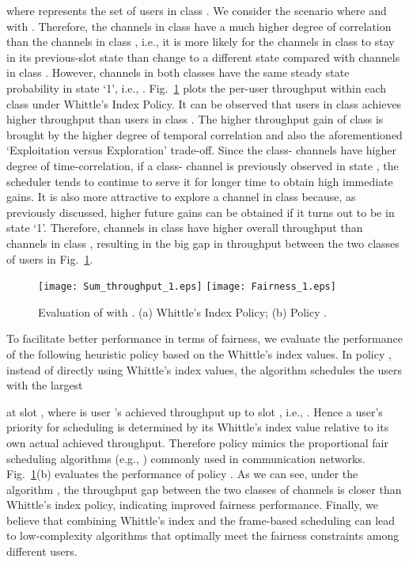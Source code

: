 \documentclass[11pt,twocolumn]{IEEEtran}
\begin{document}
where  represents the set of users in class . We consider the scenario where  and  with . Therefore, the channels in class  have a much higher degree of correlation than the channels in class , i.e., it is more likely for the channels in class  to stay in its previous-slot state than change to a different state compared with channels in class . However, channels in both classes have the same steady state probability in state `1', i.e., . Fig.~\ref{fig:Fairness} plots the per-user throughput within each class under Whittle's Index Policy. It can be observed that users in class  achieves higher throughput than users in class . The higher throughput gain of class  is brought by the higher degree of temporal correlation and also the aforementioned `Exploitation versus Exploration' trade-off. Since the class- channels have higher degree of time-correlation, if a class- channel is previously observed in state , the scheduler tends to continue to serve it for longer time to obtain high immediate gains. It is also more attractive to explore a channel in class  because, as previously discussed, higher future gains can be obtained if it turns out to be in state `1'. Therefore, channels in class  have higher overall throughput than channels in class , resulting in the big gap in throughput between the two classes of users in Fig.~\ref{fig:Fairness}.

\begin{figure}
\centering
\texttt{[image: Sum\_throughput\_1.eps]}
\texttt{[image: Fairness\_1.eps]}
\vspace{-3pt} \caption{Evaluation of  with . (a) Whittle's Index Policy; (b) Policy .}
\vspace{-15pt}
\label{fig:Fairness}
\end{figure}


To facilitate better performance in terms of fairness, we evaluate the performance of the following heuristic policy  based on the Whittle's index values. In policy , instead of directly using Whittle's index values, the algorithm schedules the  users with the largest

at slot , where  is user 's achieved throughput up to slot , i.e., . Hence a user's priority for scheduling is determined by its Whittle's index value relative to its own actual achieved throughput. Therefore policy  mimics the proportional fair scheduling algorithms (e.g.,  \cite{Tse}) commonly used in communication networks. Fig.~\ref{fig:Fairness}(b) evaluates the performance of policy . As we can see, under the algorithm , the throughput gap between the two classes of channels is closer than Whittle's index policy, indicating improved fairness performance. Finally, we believe that combining Whittle's index and the frame-based scheduling \cite{Neely_utility} can lead to  low-complexity algorithms that optimally meet the fairness constraints among different users.
\end{document}
